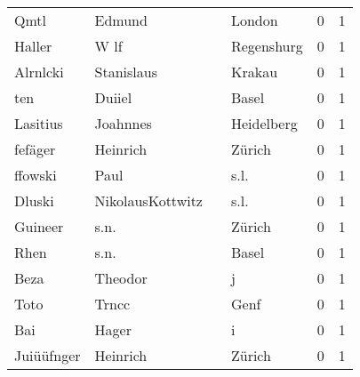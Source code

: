 \begin{tabular}{llllrr}
                     Qmtl &                             Edmund &             &                                      London &          0 &         1 \\
                   Haller &                               W lf &             &                                  Regenshurg &          0 &         1 \\
                 Alrnlcki &                         Stanislaus &             &                                      Krakau &          0 &         1 \\
                      ten &                             Duiiel &             &                                       Basel &          0 &         1 \\
                 Lasitius &                           Joahnnes &             &                                  Heidelberg &          0 &         1 \\
                  fefäger &                           Heinrich &             &                                      Zürich &          0 &         1 \\
                  ffowski &                               Paul &             &                                        s.l. &          0 &         1 \\
                   Dluski &                   NikolausKottwitz &             &                                        s.l. &          0 &         1 \\
                  Guineer &                               s.n. &             &                                      Zürich &          0 &         1 \\
                     Rhen &                               s.n. &             &                                       Basel &          0 &         1 \\
                     Beza &                            Theodor &             &                                           j &          0 &         1 \\
                     Toto &                              Trncc &             &                                        Genf &          0 &         1 \\
                      Bai &                              Hager &             &                                           i &          0 &         1 \\
               Juiüüfnger &                           Heinrich &             &                                      Zürich &          0 &         1 \\

\end{tabular}
